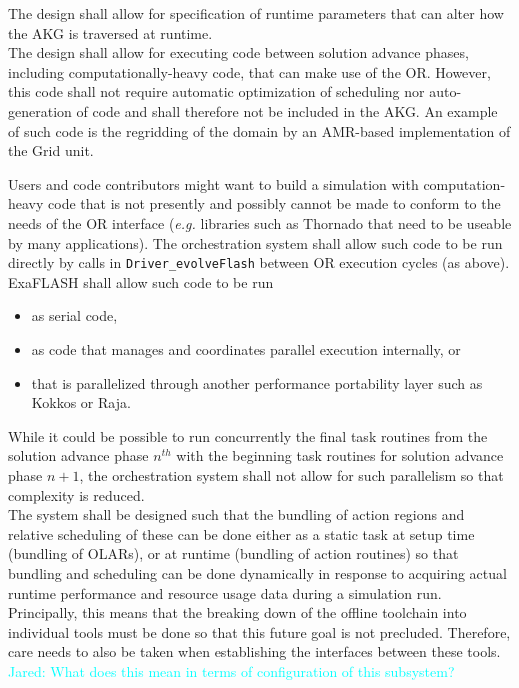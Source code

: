 \documentclass{article}
\newcommand{\FlashOfTheFuture}{ExaFLASH\xspace}
\newcommand{\Jared}[1]          {\textcolor{cyan}{Jared: #1}}
\newcommand{\shortAKG}   {AKG\xspace}
\newcommand{\shortOLARs} {OLARs\xspace}
\newcommand{\shortOR}   {OR\xspace}
\newcommand{\AKG}    {\shortAKG}
\newcommand{\OLARs}  {\shortOLARs}             %
\newcommand{\OR}        {\shortOR}
\newcommand{\taskroutines}       {task routines\xspace}
\newcommand{\actionroutines}       {action routines\xspace}
\begin{document}
The design shall allow for specification of runtime parameters that can alter
how the \AKG is traversed at runtime.\\

The design shall allow for executing code between solution advance phases, including
computationally-heavy code, that can make use of the \OR.
However, this code shall not require automatic optimization of scheduling nor
auto-generation of code and shall therefore not be included in the \AKG.
  An example of such code is the regridding of the domain by an AMR-based
implementation of the Grid unit.\\

\begin{req}
\label{req:NonORCodeInDriverEvolveFlash}
Users and code contributors might want to build a simulation with
computation-heavy code that is not presently and possibly cannot be made to
conform to the needs of the \OR interface (\textit{e.g.} libraries such as
Thornado that need to be useable by many applications).  The orchestration
system shall allow such code to be run directly by calls in
\texttt{Driver\_evolveFlash} between \OR execution cycles (as above).
\FlashOfTheFuture shall allow such code to be run
\begin{itemize}
\item{as serial code,}
\item{as code that manages and coordinates parallel execution internally, or}
\item{that is parallelized through another performance portability layer such as
Kokkos or Raja.}
\end{itemize}
\end{req}

While it could be possible to run concurrently the final \taskroutines from the
solution advance phase $n^{th}$
with the beginning \taskroutines for solution advance phase $n+1$, the orchestration
system shall not allow for such parallelism so that complexity is reduced.\\

The system shall be designed such that the bundling of action regions and relative
scheduling of these can be done either as a static task at setup time (bundling of \OLARs), or at
runtime (bundling of \actionroutines) so that bundling and scheduling can be done dynamically in response to
acquiring actual runtime performance and resource usage data during a simulation
run.  Principally, this means that the breaking down of the offline toolchain into
individual tools must be done so that this future goal is not precluded.
Therefore, care needs to also be taken when establishing the interfaces between
these tools.  \Jared{What does this mean in terms of configuration of this
subsystem?}\\
\end{document}
